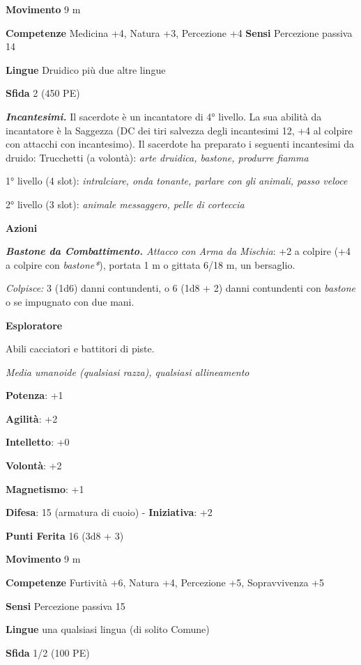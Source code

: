 \begin{multicols}{2}
\textbf{Movimento} 9 m

\textbf{Competenze} Medicina +4, Natura +3, Percezione +4 \textbf{Sensi}
Percezione passiva 14

\textbf{Lingue} Druidico più due altre lingue

\textbf{Sfida} 2 (450 PE)\smallskip

\emph{\textbf{Incantesimi.}} Il sacerdote è un incantatore di 4°
livello. La sua abilità da incantatore è la Saggezza (DC dei tiri
salvezza degli incantesimi 12, +4 al colpire con attacchi con
incantesimo). Il sacerdote ha preparato i seguenti incantesimi da
druido: Trucchetti (a volontà): \emph{arte druidica, bastone, produrre
fiamma}

1° livello (4 slot): \emph{intralciare, onda tonante, parlare con gli}
\emph{animali, passo veloce}

2° livello (3 slot): \emph{animale messaggero, pelle di corteccia}

\smallskip\textbf{Azioni}

\emph{\textbf{Bastone da Combattimento.} Attacco con Arma da Mischia}:
+2 a colpire (+4 a colpire con \emph{bastone*}), portata 1 m o gittata
6/18 m, un bersaglio.

\emph{Colpisce:} 3 (1d6) danni contundenti, o 6 (1d8 + 2) danni
contundenti con \emph{bastone} o se impugnato con due mani.

\textbf{Esploratore}

Abili cacciatori e battitori di piste.

\emph{Media umanoide (qualsiasi razza), qualsiasi allineamento}

\textbf{Potenza}: +1

\textbf{Agilità}: +2

\textbf{Intelletto}: +0

\textbf{Volontà}: +2

\textbf{Magnetismo}: +1

\textbf{Difesa}: 15 (armatura di cuoio) - \textbf{Iniziativa}: +2

\textbf{Punti Ferita} 16 (3d8 + 3)

\textbf{Movimento} 9 m

\textbf{Competenze} Furtività +6, Natura +4, Percezione +5, Sopravvivenza +5

\textbf{Sensi} Percezione passiva 15

\textbf{Lingue} una qualsiasi lingua (di solito Comune)

\textbf{Sfida} 1/2 (100 PE)\smallskip


\end{multicols}
